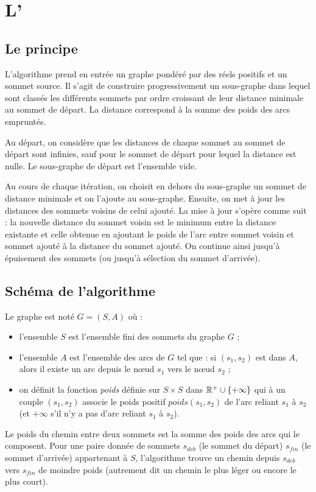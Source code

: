 \section{L'\algo}
\subsection{Le principe}
L'algorithme prend en entrée un graphe pondéré par des réels positifs et un sommet source. Il s'agit de construire progressivement un sous-graphe dans lequel sont classés les différents sommets par ordre croissant de leur distance minimale au sommet de départ. La distance correspond à la somme des poids des arcs empruntés.

Au départ, on considère que les distances de chaque sommet au sommet de départ sont infinies, sauf pour le sommet de départ pour lequel la distance est nulle. Le sous-graphe de départ est l'ensemble vide.

Au cours de chaque itération, on choisit en dehors du sous-graphe un sommet de distance minimale et on l'ajoute au sous-graphe. Ensuite, on met à jour les distances des sommets voisins de celui ajouté. La mise à jour s'opère comme suit : la nouvelle distance du sommet voisin est le minimum entre la distance existante et celle obtenue en ajoutant le poids de l'arc entre sommet voisin et sommet ajouté à la distance du sommet ajouté.
On continue ainsi jusqu'à épuisement des sommets (ou jusqu'à sélection du sommet d'arrivée).
\subsection{Schéma de l'algorithme}
Le graphe est noté  $G=(S,A)$ où :
\begin{itemize}
\item l'ensemble $S$ est l'ensemble fini des sommets du graphe $G$ ;
\item l'ensemble $A$ est l'ensemble des arcs de $G$ tel que : si $(s_{1},s_{2})$ est dans $A$, alors il existe un arc depuis le nœud $s_{1}$ vers le nœud $s_{2}$ ;

\item on définit la fonction \emph{poids} définie sur $S \times S$ dans $ \mathbb{R}^{+}\cup \{+\infty \}$ qui à un couple $(s_{1},s_{2})$ associe le poids positif \emph{$poids(s_{1},s_{2})$}  de l'arc reliant $s_{1}$ à $s_{2}$ (et $+\infty$ s'il n'y a pas d'arc reliant $s_{1}$ à $s_{2}$).
\end{itemize}
Le poids du chemin entre deux sommets est la somme des poids des arcs qui le composent. Pour une paire donnée de sommets $s_{deb}$ (le sommet du départ) $s_{fin}$ (le sommet d'arrivée) appartenant à $S$, l'algorithme trouve un chemin depuis $s_{deb}$ vers $s_{fin}$ de moindre poids (autrement dit un chemin le plus léger ou encore le plus court).

